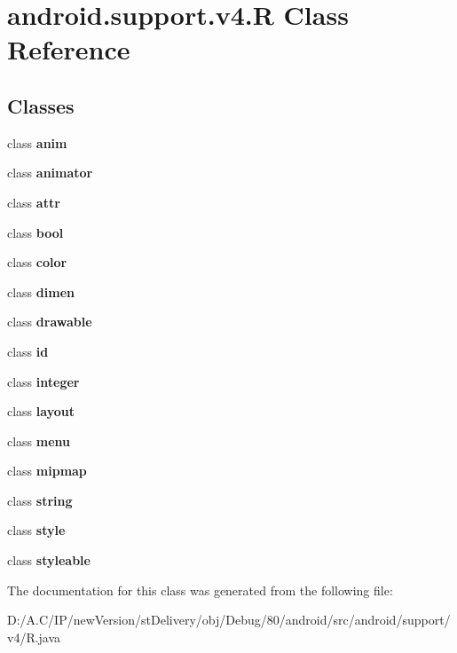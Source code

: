 \hypertarget{classandroid_1_1support_1_1v4_1_1_r}{}\section{android.\+support.\+v4.\+R Class Reference}
\label{classandroid_1_1support_1_1v4_1_1_r}
\subsection*{Classes}
\begin{DoxyCompactItemize}
\item 
class {\bfseries anim}
\item 
class {\bfseries animator}
\item 
class {\bfseries attr}
\item 
class {\bfseries bool}
\item 
class {\bfseries color}
\item 
class {\bfseries dimen}
\item 
class {\bfseries drawable}
\item 
class {\bfseries id}
\item 
class {\bfseries integer}
\item 
class {\bfseries layout}
\item 
class {\bfseries menu}
\item 
class {\bfseries mipmap}
\item 
class {\bfseries string}
\item 
class {\bfseries style}
\item 
class {\bfseries styleable}
\end{DoxyCompactItemize}


The documentation for this class was generated from the following file\+:\begin{DoxyCompactItemize}
\item 
D\+:/\+A.\+C/\+I\+P/new\+Version/st\+Delivery/obj/\+Debug/80/android/src/android/support/v4/R.\+java\end{DoxyCompactItemize}
